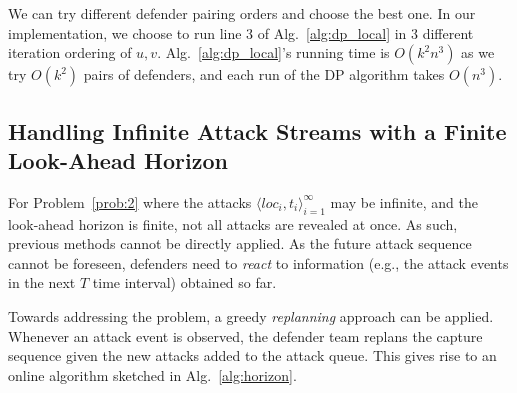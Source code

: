 We can try different defender pairing orders and choose the best one. 
In our \ours implementation, we choose to run line 3 of Alg.~\ref{alg:dp_local} in 3 different iteration ordering of $u, v$.
Alg.~\ref{alg:dp_local}'s running time is $O(k^2 n^3)$ as we try $O(k^2)$ pairs of defenders, and each run of the DP algorithm takes $O(n^3)$.

\subsection{Handling Infinite Attack Streams with a Finite Look-Ahead Horizon }
\label{sec:hor}
For Problem~\ref{prob:2} where the attacks $\big \langle loc_i, t_i\big \rangle_{i=1}^{\infty}$ may be infinite, and the look-ahead horizon is finite, not all attacks are revealed at once. As such, previous methods cannot be directly applied. 
As the future attack sequence cannot be foreseen, defenders need to \emph{react} to information (e.g., the attack events in the next $T$ time interval) obtained so far. 

Towards addressing the problem, a greedy \emph{replanning} approach can be applied. Whenever an attack event is observed, the defender team replans the capture sequence given the new attacks added to the attack queue. 
This gives rise to an online algorithm sketched in Alg.~\ref{alg:horizon}.

